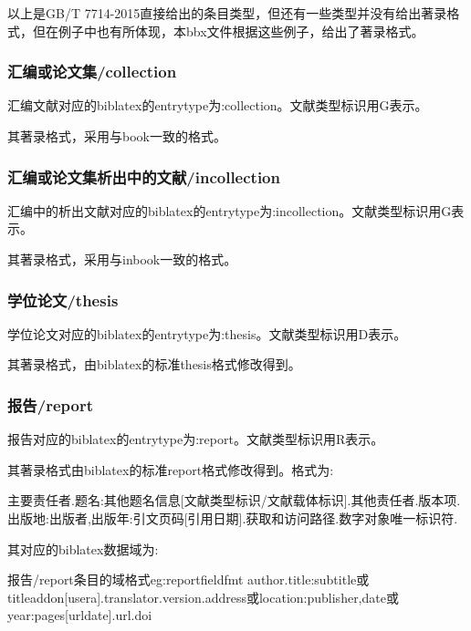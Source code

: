 \documentclass[11pt]{article} %
\begin{document}
以上是GB/T 7714-2015直接给出的条目类型，但还有一些类型并没有给出著录格式，但在例子中也有所体现，本bbx文件根据这些例子，给出了著录格式。

\subsubsection{汇编或论文集/collection}

\begin{refentry}{}{}
汇编文献对应的biblatex的entrytype为:collection。文献类型标识用G表示。

其著录格式，采用与book一致的格式。
\end{refentry}

\subsubsection{汇编或论文集析出中的文献/incollection}
\begin{refentry}{}{}
汇编中的析出文献对应的biblatex的entrytype为:incollection。文献类型标识用G表示。

其著录格式，采用与inbook一致的格式。
\end{refentry}

\subsubsection{学位论文/thesis}
\begin{refentry}{}{}
学位论文对应的biblatex的entrytype为:thesis。文献类型标识用D表示。

其著录格式，由biblatex的标准thesis格式修改得到。
\end{refentry}

\subsubsection{报告/report}
\begin{refentry}{}{}
报告对应的biblatex的entrytype为:report。文献类型标识用R表示。

其著录格式由biblatex的标准report格式修改得到。格式为:

主要责任者.题名:其他题名信息[文献类型标识/文献载体标识].其他责任者.版本项.出版地:出版者,出版年:引文页码[引用日期].获取和访问路径.数字对象唯一标识符.
\end{refentry}

其对应的biblatex数据域为:
\begin{codetex}{报告/report条目的域格式}{eg:reportfieldfmt}
author.title:subtitle或titleaddon[usera].translator.version.address或location:publisher,date或year:pages[urldate].url.doi
\end{codetex}
\end{document}
